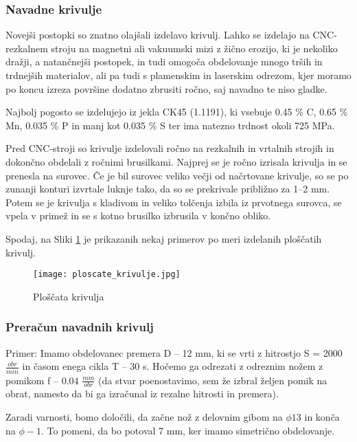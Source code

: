 \subsubsection{Navadne krivulje}
Novejši postopki so znatno olajšali izdelavo krivulj.
Lahko se izdelajo na CNC-rezkalnem stroju na magnetni ali vakuumski mizi
z žično erozijo, ki je nekoliko dražji, a natančnejši postopek, in tudi omogoča
obdelovanje mnogo trših in trdnejših materialov, ali pa tudi s
plamenskim in laserskim odrezom, kjer moramo po koncu izreza površine
dodatno zbrusiti ročno, saj navadno te niso gladke.

Najbolj pogosto se izdelujejo iz jekla CK45 (1.1191), ki vsebuje
0.45 \% C, 0.65 \% Mn, 0.035 \% P in manj kot 0.035 \% S ter ima natezno trdnost okoli 725 MPa. \cite{interna}

Pred CNC-stroji so krivulje izdelovali ročno na rezkalnih in vrtalnih strojih
in dokončno obdelali z ročnimi brusilkami.
Najprej se je ročno izrisala krivulja in se prenesla na surovec.
Če je bil surovec veliko večji od načrtovane krivulje, so se po
zunanji konturi izvrtale luknje tako, da so se prekrivale približno za 1--2 mm. Potem se je krivulja s kladivom in veliko tolčenja izbila iz prvotnega surovca,
se vpela v primež in se s kotno brusilko izbrusila v končno obliko.

Spodaj, na Sliki \ref{ploscate_krivulje} je prikazanih nekaj primerov
po meri izdelanih ploščatih krivulj.

\begin{figure}[H]
	\begin{center}
		\texttt{[image: ploscate\_krivulje.jpg]}
		\caption{Ploščata krivulja
			\cite{lasten}}
		\label{ploscate_krivulje}
	\end{center}
\end{figure}

\subsubsection{Preračun navadnih krivulj}
\label{izracun_krivulj}
Primer: Imamo obdelovanec premera D -- 12 mm, ki se vrti z hitrostjo S = 2000 \( \frac{obr}{min} \)
in časom enega cikla T -- 30 s. Hočemo ga odrezati z odreznim nožem z pomikom f -- 0.04 \( \frac{mm}{obr} \)
(da stvar poenostavimo, sem že izbral željen pomik na obrat, namesto da bi ga
izračunal iz rezalne hitrosti in premera).

Zaradi varnosti, bomo določili, da začne nož z delovnim gibom
na $\phi13$ in konča na $\phi-1$. To pomeni, da bo potoval 7 mm, ker
imamo simetrično obdelovanje.

